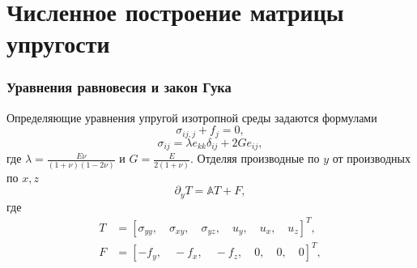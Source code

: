 \section{Численное построение матрицы упругости}
\begin{frame}
    \frametitle{Уравнения равновесия и закон Гука}
    Определяющие уравнения упругой изотропной среды задаются формулами
    \begin{equation}
        \label{eq:equilibrium}
        \sigma_{ij,j} + f_j = 0,
    \end{equation}
    \begin{equation}		
        \sigma_{ij} = \lambda e_{kk}\delta_{ij} + 2G e_{ij},
        \label{eq:hooke_law}
    \end{equation}
    где $\lambda = \frac{E \nu}{(1+\nu)(1-2\nu)}$ и $ G = \frac{E}{2(1+\nu)} $.
    Отделяя производные по $y$ от производных по $x, z$
    \begin{equation}
        \label{eq:separate}
        \partial_{y} T = \mathbb{A}T + F,
    \end{equation}
    где
    \begin{equation}
        \label{eq:T}
        \begin{split}
            T &= \left[\sigma_{yy} , \quad \sigma_{xy} , \quad \sigma_{yz} , \quad u_{y} , \quad u_{x} , \quad u_{z}\right]^T, \\
            F &= \left[-f_y , \quad -f_x , \quad -f_z , \quad 0 , \quad 0 , \quad 0\right]^T,
        \end{split}
    \end{equation}
\end{frame}


